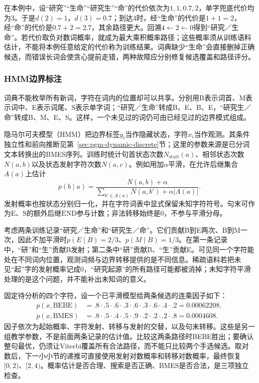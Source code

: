 在本例中，设“研究”“生命”“研究生”“命”的代价依次为$1,1,0.7,2$，单字兜底代价均为3。于是$d(2)=1$，$d(3)=0.7$；到达4时，经“生命”的代价是$1+1=2$，经“命”的代价是$0.7+2=2.7$，其余路径更大。回溯$4\leftarrow2\leftarrow0$得到“研究／生命”。若代价取负对数词概率，就成为最大乘积概率路径；这些概率须从训练语料估计，不能将本例任意给定的代价称为训练结果。词典缺少“生命”会直接删掉正确候选，而错误长词会使贪心提前走错，两种故障应分别修复候选覆盖和路径评分。

\subsubsection{HMM边界标注}
\label{sec:nlp-analysis-hmm-boundary}

词典不能枚举所有新词，字符在词内的位置却可以共享。分别用B表示词首、M表示词中、E表示词尾、S表示单字词；“研究／生命”转成B、E、B、E，“研究生／命”转成B、M、E、S。这样，一个未见过的词仍可由已经见过的边界模式组成。

隐马尔可夫模型（HMM）把边界标签$y_i$当作隐藏状态，字符$x_i$当作观测。其条件独立性和前向推断见第~\ref{sec:pgm-dynamic-discrete}节；这里的参数来源是已分词文本转换出的BMES序列。训练时统计句首状态次数$N_{\mathrm{start}}(a)$、相邻状态次数$N(a,b)$以及状态发射字符次数$N(a,c)$。例如用加$\alpha$平滑，在允许后继集合$A(a)$上估计
\[
  p(b\mid a)=
  \frac{N(a,b)+\alpha}
       {\sum_{b'\in A(a)}N(a,b')+\alpha|A(a)|}.
\]
发射概率也按状态分别归一化，并在字符词表中显式保留未知字符符号。句末可作为E、S的额外后继$\mathrm{END}$参与计数；非法转移始终是0，不参与平滑分母。

考虑两条训练记录“研究／生命”和“研究生／命”。它们贡献B到E两次、B到M一次，因此不加平滑时$p(E\mid B)=2/3$、$p(M\mid B)=1/3$。在第一条记录中，“研”和“生”贡献B发射；第二条中“研”贡献B、“生”贡献E。可见同一个字符能处在不同词内位置，观测词频与边界转移提供的是不同信息。稀疏语料若把未见“起”字的发射概率记成0，“研究起源”的所有路径可能都被消掉；未知字符平滑处理的是这个问题，并不能补出未知词的意义。

固定待分析的四个字符，设一个已平滑模型给两条候选的连乘因子如下：
\[
\begin{aligned}
 p(x,\mathrm{BEBE})&=
 .8\cdot.5\cdot.6\cdot.3\cdot.6\cdot.3
 \cdot.6\cdot.4\cdot.2=0.00062208,\\
 p(x,\mathrm{BMES})&=
 .8\cdot.5\cdot.4\cdot.5\cdot.9\cdot.2
 \cdot.2\cdot.2\cdot.8=0.0004608.
\end{aligned}
\]
因子依次为起始概率、字符发射、转移与发射的交替，以及句末转移。这些是另一组教学参数，不是前面两条记录的估计值。比较这两条路径时BEBE胜出；要确认整句最优，仍须让Viterbi覆盖所有合法路径，而不能只比较两个手选候选。取对数后，下一小小节的递推可直接使用发射对数概率和转移对数概率，最终恢复$[0,2)$、$[2,4)$。概率估计是否合理、搜索是否正确、BMES是否合法，是三项独立检查。

